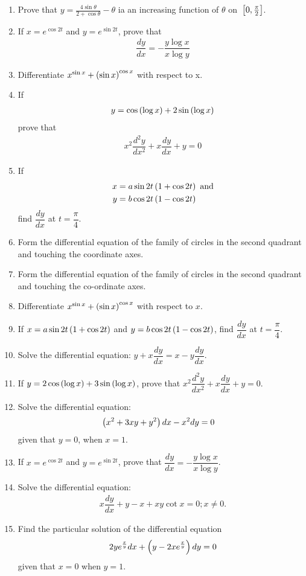 \begin{enumerate}
	\item Prove that $ y = \frac{4\sin \theta}{2+ \cos \theta} - \theta$ ia an increasing function of $\theta$ on ${}\left[0,\frac{\pi}{2}\right]$.
\item If $x=e^{\cos 2t}$ and $y=e^{\sin 2t}$, prove that
          \begin{align*}
              \dfrac{dy}{dx}= -\dfrac{y \log x}{x \log y}
          \end{align*}
    \item Differentiate $x^{\sin x}+ \left(\sin x\right)^{\cos x}$ with respect to x.
    \item If
          \begin{align*}
              y=\cos \left(\log x\right) + 2 \sin \left(\log x\right)
          \end{align*}
          prove that
          \begin{align*}
              x^2 \dfrac{d^2 y}{dx^2} + x \dfrac{dy}{dx} +y =0
          \end{align*}
    \item If
          \begin{align*}
              x & =a\sin 2t\left(1+\cos 2t\right) \text{ and} \\
              y & =b\cos 2t\left(1-\cos 2t\right)
          \end{align*}
          find $\dfrac{dy}{dx}$ at $t=\dfrac{\pi}{4}$.
    \item Form the differential equation of the family of circles in the second quadrant and touching the coordinate axes.
\item Form the differential equation of the family of circles in the second quadrant and touching the co-ordinate axes.
\item Differentiate $x^{\sin{x}} + \left(\sin{x}\right)^{\cos{x}}$ with respect to $x$.
\item If $x = a\sin{2t}\left(1 + \cos{2t}\right)$ and $y = b\cos{2t}\left(1 - \cos{2t}\right)$, find $ \dfrac{dy}{dx}$ at $t = \dfrac{\pi}{4}$.
\item Solve the differential equation: $y + x\dfrac{dy}{dx} = x - y\dfrac{dy}{dx}$.
\item If $y = 2\cos{\ensuremath{\left(\log{x}\right)}} + 3\sin{\ensuremath{\left(\log{x}\right)}}$, prove that $x^2\dfrac{d^2y}{dx^2} + x\dfrac{dy}{dx} + y = 0$.
\item Solve the differential equation:
	\begin{align*}
		\left(x^2 +3xy + y^2\right)dx - x^2dy &= 0
	\end{align*}
given that $y=0$, when $x=1$.
\item If $x = e^{\cos{2t}}$ and $y = e^{\sin{2t}}$, prove that $ \dfrac{dy}{dx} = -\dfrac{y\log{x}}{x\log{y}}$.
\item Solve the differential equation:
	\begin{align*}
		x\dfrac{dy}{dx} + y - x + xy\cot{x} = 0; x \neq 0.
	\end{align*}
 \item Find the particular solution of the differential equation
\begin{align*}
2ye^{\frac{x}{y}}dx + \left(y - 2xe^{\frac{x}{y}}\right)dy = 0
\end{align*}
given that $x=0$ when $y=1$.


\end{enumerate}
